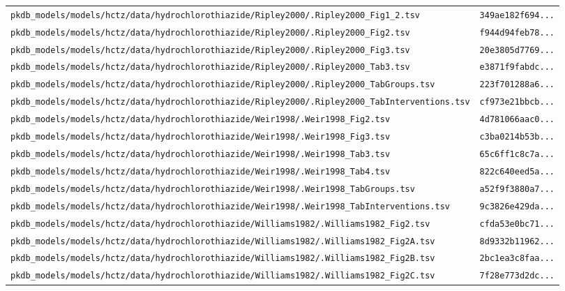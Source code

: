 \documentclass{article}
\begin{document}
\begin{longtable}{ll}
\texttt{pkdb\_models/models/hctz/data/hydrochlorothiazide/Ripley2000/.Ripley2000\_Fig1\_2.tsv} & \texttt{349ae182f694...} \\
\texttt{pkdb\_models/models/hctz/data/hydrochlorothiazide/Ripley2000/.Ripley2000\_Fig2.tsv} & \texttt{f944d94feb78...} \\
\texttt{pkdb\_models/models/hctz/data/hydrochlorothiazide/Ripley2000/.Ripley2000\_Fig3.tsv} & \texttt{20e3805d7769...} \\
\texttt{pkdb\_models/models/hctz/data/hydrochlorothiazide/Ripley2000/.Ripley2000\_Tab3.tsv} & \texttt{e3871f9fabdc...} \\
\texttt{pkdb\_models/models/hctz/data/hydrochlorothiazide/Ripley2000/.Ripley2000\_TabGroups.tsv} & \texttt{223f701288a6...} \\
\texttt{pkdb\_models/models/hctz/data/hydrochlorothiazide/Ripley2000/.Ripley2000\_TabInterventions.tsv} & \texttt{cf973e21bbcb...} \\
\texttt{pkdb\_models/models/hctz/data/hydrochlorothiazide/Weir1998/.Weir1998\_Fig2.tsv} & \texttt{4d781066aac0...} \\
\texttt{pkdb\_models/models/hctz/data/hydrochlorothiazide/Weir1998/.Weir1998\_Fig3.tsv} & \texttt{c3ba0214b53b...} \\
\texttt{pkdb\_models/models/hctz/data/hydrochlorothiazide/Weir1998/.Weir1998\_Tab3.tsv} & \texttt{65c6ff1c8c7a...} \\
\texttt{pkdb\_models/models/hctz/data/hydrochlorothiazide/Weir1998/.Weir1998\_Tab4.tsv} & \texttt{822c640eed5a...} \\
\texttt{pkdb\_models/models/hctz/data/hydrochlorothiazide/Weir1998/.Weir1998\_TabGroups.tsv} & \texttt{a52f9f3880a7...} \\
\texttt{pkdb\_models/models/hctz/data/hydrochlorothiazide/Weir1998/.Weir1998\_TabInterventions.tsv} & \texttt{9c3826e429da...} \\
\texttt{pkdb\_models/models/hctz/data/hydrochlorothiazide/Williams1982/.Williams1982\_Fig2.tsv} & \texttt{cfda53e0bc71...} \\
\texttt{pkdb\_models/models/hctz/data/hydrochlorothiazide/Williams1982/.Williams1982\_Fig2A.tsv} & \texttt{8d9332b11962...} \\
\texttt{pkdb\_models/models/hctz/data/hydrochlorothiazide/Williams1982/.Williams1982\_Fig2B.tsv} & \texttt{2bc1ea3c8faa...} \\
\texttt{pkdb\_models/models/hctz/data/hydrochlorothiazide/Williams1982/.Williams1982\_Fig2C.tsv} & \texttt{7f28e773d2dc...} \\

\end{longtable}
\end{document}
